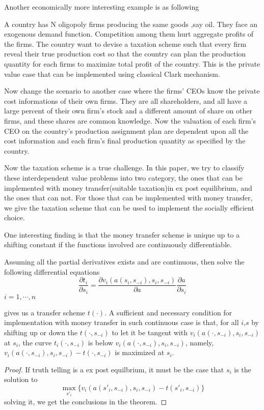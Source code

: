 Another economically more interesting example is as following 
\begin{example}
A country has N oligopoly firms producing the same goods ,say oil. They face an exogenous demand function. Competition among them hurt
aggregate profits of the firms. 
The country want to devise a taxation scheme such that every firm reveal their true production cost so that the country can plan
the production quantity for each firms to maximize total profit of the country. This is the private value case that can be implemented
using classical Clark mechanism. 
\end{example}
Now change the scenario to another case where the firms' CEOs know the private cost informations of their own firms. They are all 
shareholders, and all have a large percent of their own firm's stock and a different amount of share on other firms, and these shares
are common knowledge.  Now the valuation of each firm's CEO on the country's production assignment plan are dependent upon all
the cost information and each firm's final production quantity as specified by the country.
 
Now the taxation scheme is a true challenge. In this paper, we try to classify these interdependent value problems into two category,
the ones that can be implemented with money transfer(suitable taxation)in ex post equilibrium, and the ones that can not. For those
that can be implemented with money transfer, we give the taxation scheme that can be used to implement the socially efficient choice.

One interesting finding is that the money transfer scheme is unique up to a shifting constant if the functions involved are
continuously differentiable.

\begin{thm}
Assuming all the partial derivatives exists and are continuous, then solve the following 
differential equations
 $$\frac{\partial t_i}{\partial s_i} = \frac{\partial v_i(a(s_i,s_{-i}),s_i,s_{-i})}{\partial a } \frac{\partial a}{\partial s_i}$$
 $i=1,\cdots,n$ 
 
 gives us a transfer scheme $t(\cdot)$.
A sufficient and necessary condition for implementation with money transfer in such continuous case is that, for all $i$,$s$
by shifting up or down the $t(\cdot,s_{-i})$ to let it be tangent with $ v_i(a(\cdot,s_{-i}),s_i,s_{-i})$ at $s_i$, the curve
$t_i(\cdot,s_{-i})$ is below $ v_i(a(\cdot,s_{-i}),s_i,s_{-i})$, namely, $v_i(a(\cdot,s_{-i}),s_i,s_{-i})-t(\cdot,s_{-i})$ is
maximized at $s_i$.

 
\end{thm}
\begin{proof}
 If truth telling is a ex post equilbrium, it must be the case that $s_i$ is the solution to
 $$\max_{s'_i} \{v_i(a(s'_i,s_{-i}),s_i,s_{-i})-t(s'_i,s_{-i})\}$$
 solving it, we get the conclusions in the theorem.
\end{proof}

